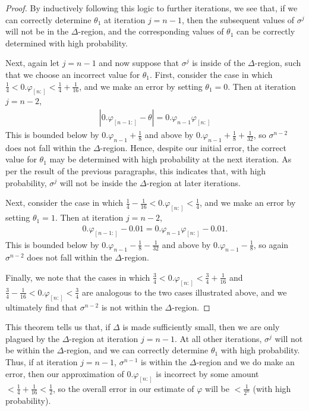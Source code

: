 \documentclass[aps,pra,showpacs,notitlepage,twocolumn,superscriptaddress,nofootinbib]{revtex4-1}
\begin{document}
\begin{proof}
By inductively following this logic to further iterations, we see that, if we can correctly determine $\theta_1$ at iteration $j=n-1$, then the subsequent values of $\sigma^j$ will not be in the $\Delta$-region, and the corresponding values of $\theta_1$ can be correctly determined with high probability.

Next, again let $j=n-1$ and now suppose that $\sigma^j$ is inside of the $\Delta$-region, such that we choose an incorrect value for $\theta_1$. First, consider the case in which $\frac{1}{4} < 0.\varphi_{[n:]} <\frac{1}{4} + \frac{1}{16}$, and we make an error by setting $\theta_1 = 0$. Then at iteration $j=n-2$, 
\begin{equation}
\begin{gathered}
    |0.\varphi_{[n-1:]} - \theta| = 0.\varphi_{n-1}\varphi_{[n:]} 
\end{gathered}
\end{equation}
This is bounded below by $0.\varphi_{n-1} + \frac{1}{8}$ and above by $0.\varphi_{n-1} + \frac{1}{8} +  \frac{1}{32}$, so $\sigma^{n-2}$ does not fall within the $\Delta$-region. Hence, despite our initial error, the correct value for $\theta_1$ may be determined with high probability at the next iteration. As per the result of the previous paragraphs, this indicates that, with high probability, $\sigma^j$ will not be inside the $\Delta$-region at later iterations. 

Next, consider the case in which $\frac{1}{4}-\frac{1}{16} < 0.\varphi_{[n:]} <\frac{1}{4}$, and we make an error by setting $\theta_1 = 1$. Then at iteration $j=n-2$, 
\begin{equation}
\begin{gathered}
    0.\varphi_{[n-1:]} - 0.01 = 0.\varphi_{n-1}\varphi_{[n:]} - 0.01.
\end{gathered}
\end{equation}
This is bounded below by $0.\varphi_{n-1} - \frac{1}{8} - \frac{1}{32}$ and above by $0.\varphi_{n-1} - \frac{1}{8}$, so again $\sigma^{n-2}$ does not fall within the $\Delta$-region. 

Finally, we note that the cases in which $\frac{3}{4} < 0.\varphi_{[n:]} <\frac{3}{4} + \frac{1}{16}$ and $\frac{3}{4}-\frac{1}{16} < 0.\varphi_{[n:]} <\frac{3}{4}$ are analogous to the two cases illustrated above, and we ultimately find that $\sigma^{n-2}$ is not within the $\Delta$-region. 

\end{proof}

This theorem tells us that, if $\Delta$ is made sufficiently small, then we are only plagued by the $\Delta$-region at iteration $j=n-1$. At all other iterations, $\sigma^j$ will not be within the $\Delta$-region, and we can correctly determine $\theta_1$ with high probability. Thus, if at iteration $j=n-1$, $\sigma^{n-1}$ is within the $\Delta$-region and we do make an error, then our approximation of $0.\varphi_{[n:]}$ is incorrect by some amount $ < \frac{1}{4} +  \frac{1}{16} < \frac{1}{2}$, so the overall error in our estimate of $\varphi$ will be $< \frac{1}{2^n}$ (with high probability). 
\end{document}
